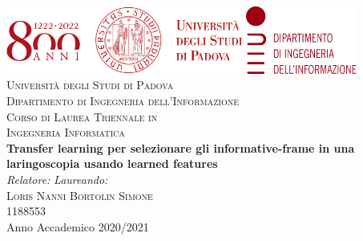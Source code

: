 \documentclass[a4paper,11pt]{book}
\begin{document}
\begin{titlepage}
\begin{center}
\includegraphics[height=2.22cm]{images/unipd_800_logotipo_sigillo.pdf}  \hfill \includegraphics[height=2.22cm]{images/dei_sigillo_logotipe.pdf}  \\

\vspace{0.8cm}
\textsc{\LARGE Università degli Studi di Padova}\\
\vspace{0.45cm}
\textsc{\large Dipartimento di Ingegneria dell'Informazione}\\
\vspace{0.4cm}
\textsc{\large Corso di Laurea Triennale in}\\
\textsc{\large Ingegneria Informatica}\\
\vfill
{ \LARGE \bfseries Transfer learning per selezionare gli informative-frame in una laringoscopia usando learned features ​
}\\
\vfill
\textit{\large Relatore:} \hfill \textit{\large Laureando:}\\
\textsc{\large Loris Nanni} \hfill \textsc{Bortolin Simone}\\
\hfill \textsc{1188553}\\

\vfill
{\large Anno Accademico 2020/2021}
\end{center}
\end{titlepage}

\thispagestyle{empty} %
\cleardoublepage

\thispagestyle{empty}

\clearpage{\pagestyle{plain}\cleardoublepage}


\clearpage{\pagestyle{plain}\cleardoublepage}
\tableofcontents %
\end{document}
